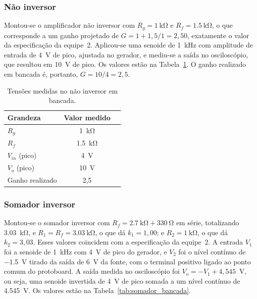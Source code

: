 \documentclass[11pt,a4paper]{article}
\begin{document}
\subsubsection{Não inversor}

Montou-se o amplificador não inversor com $R_g = \SI{1}{\kilo\ohm}$ e $R_f = \SI{1,5}{\kilo\ohm}$, o que corresponde a um ganho projetado de $G = 1 + 1{,}5/1 = 2{,}50$, exatamente o valor da especificação da equipe~2. Aplicou-se uma senoide de \SI{1}{\kilo\hertz} com amplitude de entrada de \SI{4}{\volt} de pico, ajustada no gerador, e mediu-se a saída no osciloscópio, que resultou em \SI{10}{\volt} de pico. Os valores estão na Tabela~\ref{tab:nao_inv_bancada}. O ganho realizado em bancada é, portanto, $G = 10/4 = 2{,}5$. 

\begin{table}[h]
\centering
\caption{Tensões medidas no não inversor em bancada.}
\label{tab:nao_inv_bancada}
\begin{tabular}{lcc}
\hline
Grandeza & Valor medido \\
\hline
$R_g$ & \SI{1}{\kilo\ohm} \\
$R_f$ & \SI{1,5}{\kilo\ohm} \\
$V_{in}$ (pico) & \SI{4}{\volt} \\
$V_o$ (pico) & \SI{10}{\volt} \\
Ganho realizado & 2,5 \\
\hline
\end{tabular}
\end{table}

\subsubsection{Somador inversor}

Montou-se o somador inversor com $R_f = \SI{2,7}{\kilo\ohm} + \SI{330}{\ohm}$ em série, totalizando \SI{3,03}{\kilo\ohm}, e $R_1 = R_f = \SI{3,03}{\kilo\ohm}$, o que dá $k_1 = 1{,}00$; e $R_2 = \SI{1}{\kilo\ohm}$, o que dá $k_2 = 3{,}03$. Esses valores coincidem com a especificação da equipe~2. A entrada $V_1$ foi a senoide de \SI{1}{\kilo\hertz} com \SI{4}{\volt} de pico do gerador, e $V_2$ foi o nível contínuo de \SI{-1,5}{\volt} tirado da saída de \SI{6}{\volt} da fonte, com o terminal positivo ligado ao ponto comum do protoboard. A saída medida no osciloscópio foi $V_o = -V_1 + 4{,}545$~V, ou seja, uma senoide invertida de \SI{4}{\volt} de pico somada a um nível contínuo de \SI{4,545}{\volt}. Os valores estão na Tabela~\ref{tab:somador_bancada}.
\end{document}
